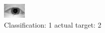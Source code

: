 \begin{figure}[h!]
\begin{center}
\includegraphics[width=0.60\columnwidth]{figures/ID944_class_1_target_2.png}
\end{center}
\caption{ Classification: 1 actual target: 2}
\label{fig:ID944_class_1_target_2}
\end{figure}
